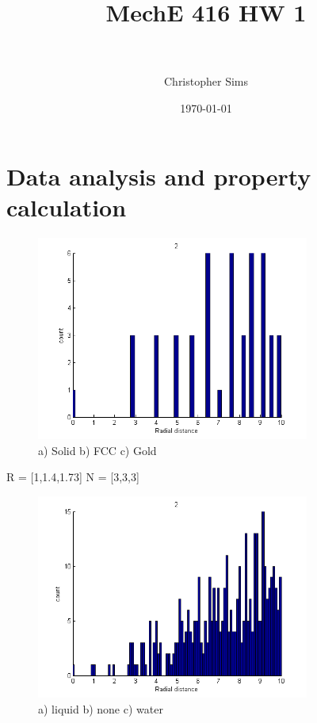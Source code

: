 \documentclass[paper=a4, fontsize=12pt]{scrartcl} %
\title{	
\normalfont \normalsize 
\huge MechE 416 HW 1 \\ %
\horrule{2pt} \\[0.5cm] %
}
\author{Christopher Sims} %
\date{\normalsize\today} %
\numberwithin{equation}{section} %
\numberwithin{figure}{section} %
\numberwithin{table}{section} %
\begin{document}
\maketitle %


\section{\small{Data analysis and property calculation}}
\begin{figure}[H]
  \centering
      \includegraphics[width=0.8\textwidth]{1.png}
  \caption{a) Solid b) FCC c) Gold }
\end{figure}
R = [1,1.4,1.73]
N = [3,3,3]
\begin{figure}[H]
  \centering
      \includegraphics[width=0.8\textwidth]{2.png}
  \caption{a) liquid b) none c) water}
\end{figure}
\end{document}
